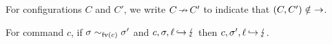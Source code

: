 \documentclass[11pt]{report}
\begin{document}
% 			
% 			
% 			
% 
% 
% 
% 
% 			
% 
% 			
% 
% 			
% 			
% 			
% 
% 			
% 			
% 			
% 			
% 			
% 			


For configurations $C$ and $C'$, we write $C \operatorname{\nrightarrow} C'$ to indicate that $(C,C') \notin \operatorname{\rightarrow}$. 



\begin{lemma}
	\label{lem:comm-fv-abort}
	For command $c$, if $\sigma \sim_{\mathrm{fv}(c)} \sigma'$ and $c,\sigma,\ell \operatorname{\hookrightarrow} \lightning$ then $c,\sigma',\ell \operatorname{\hookrightarrow} \lightning$. 
\end{lemma}
\end{document}
